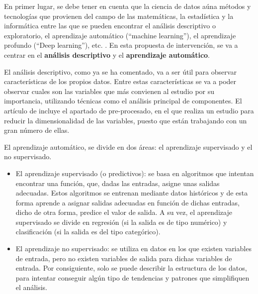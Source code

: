 En primer lugar, se debe tener en cuenta que la ciencia de datos aúna métodos y tecnologías que provienen del campo de las matemáticas, la estadística y la informática entre las que se pueden encontrar el análisis descriptivo o exploratorio, el aprendizaje automático (“machine learning”), el aprendizaje profundo (“Deep learning”), etc. \cite{MARIN2018}. En esta propuesta de intervención, se va a centrar en el \textbf{análisis descriptivo} y el \textbf{aprendizaje automático}.

El análisis descriptivo, como ya se ha comentado, va a ser útil para observar características de los propios datos. Entre estas características se va a poder observar cuales son las variables que más convienen al estudio por su importancia, utilizando técnicas como el análisis principal de componentes. El artículo de  incluye el apartado de pre-procesado, en el que realiza un estudio para reducir la dimensionalidad de las variables, puesto que están trabajando con un gran número de ellas.

El aprendizaje automático, se divide en dos áreas: el aprendizaje supervisado y el no supervisado. 

\begin{itemize}
\item El aprendizaje supervisado (o predictivos): se basa en algoritmos que intentan encontrar una función, que, dadas las entradas, asigne unas salidas adecuadas. Estos algoritmos se entrenan mediante datos históricos y de esta forma aprende a asignar salidas adecuadas en función de dichas entradas, dicho de otra forma, predice el valor de salida. A su vez, el aprendizaje supervisado se divide en regresión (si la salida es de tipo numérico) y clasificación (si la salida es del tipo categórico). \cite{Recuero2017}
\item El aprendizaje no supervisado: se utiliza en datos en los que existen variables de entrada, pero no existen variables de salida para dichas variables de entrada. Por consiguiente, solo se puede describir la estructura de los datos, para intentar conseguir algún tipo de tendencias y patrones que simplifiquen el análisis.\cite{Recuero2017} \cite{rodriguez2009herramientas}
\end{itemize}

